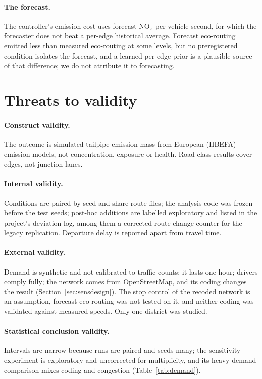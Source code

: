 \documentclass[11pt]{article}
\begin{document}
\paragraph{The forecast.} The controller's emission cost uses forecast NO$_x$ per vehicle-second, for which the
forecaster does not beat a per-edge historical average. Forecast eco-routing emitted less than measured eco-routing
at some levels, but no preregistered condition isolates the forecast, and a learned per-edge prior is a plausible
source of that difference; we do not attribute it to forecasting.

\section{Threats to validity}\label{sec:threats}
\paragraph{Construct validity.} The outcome is simulated tailpipe emission mass from European (HBEFA) emission
models, not concentration, exposure or health. Road-class results cover edges, not junction lanes.
\paragraph{Internal validity.} Conditions are paired by seed and share route files; the analysis code was frozen
before the test seeds; post-hoc additions are labelled exploratory and listed in the project's deviation log, among
them a corrected route-change counter for the legacy replication. Departure delay is reported apart from travel time.
\paragraph{External validity.} Demand is synthetic and not calibrated to traffic counts; it lasts one hour; drivers
comply fully; the network comes from OpenStreetMap, and its coding changes the result (Section~\ref{sec:sensdesign}).
The stop control of the recoded network is an assumption, forecast eco-routing was not tested on it, and neither
coding was validated against measured speeds. Only one district was studied.
\paragraph{Statistical conclusion validity.} Intervals are narrow because runs are paired and seeds many; the
sensitivity experiment is exploratory and uncorrected for multiplicity, and its heavy-demand comparison mixes coding
and congestion (Table~\ref{tab:demand}).
\end{document}

